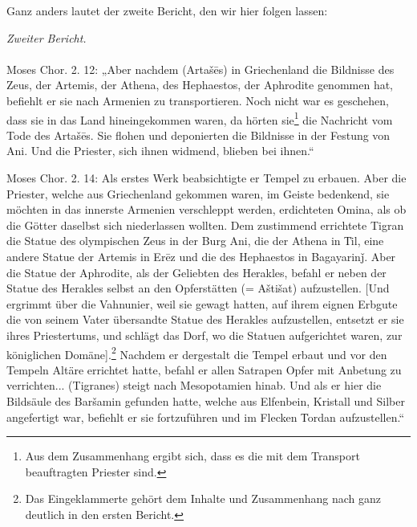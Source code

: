\documentclass{article}
\begin{document}
Ganz anders lautet der zweite Bericht, den wir hier folgen lassen:
\begin{center}
\emph{Zweiter Bericht.}
\end{center}
\paragraph{}
Moses Chor. 2. 12: „Aber nachdem (Artašēs) in Griechenland die Bildnisse des Zeus, der Artemis, der Athena, des Hephaestos, der Aphrodite genommen hat, befiehlt er sie nach Armenien zu transportieren. Noch nicht war es geschehen, dass sie in das Land hineingekommen waren, da hörten sie\footnote{Aus dem Zusammenhang ergibt sich, dass es die mit dem Transport beauftragten Priester sind.} die Nachricht vom Tode des Artašēs. Sie flohen und deponierten die Bildnisse in der Festung von Ani. Und die Priester, sich ihnen widmend, blieben bei ihnen.“

Moses Chor. 2. 14: Als erstes Werk beabsichtigte er Tempel zu erbauen. Aber die Priester, welche aus Griechenland gekommen waren, im Geiste bedenkend, sie möchten in das innerste Armenien verschleppt werden, erdichteten Omina, als ob die Götter daselbst sich niederlassen wollten. Dem zustimmend errichtete Tigran die Statue des olympischen Zeus in der Burg Ani, die der Athena in T͑il, eine andere Statue der Artemis in Erēz und die des Hephaestos in Bagayarinǰ. Aber die Statue der Aphrodite, als der Geliebten des Herakles, befahl er neben der Statue des Herakles selbst an den Opferstätten (= Aštišat) aufzustellen. [Und ergrimmt über die Vahnunier, weil sie gewagt hatten, auf ihrem eignen Erbgute die von seinem Vater übersandte Statue des Herakles aufzustellen, entsetzt er sie ihres Priestertums, und schlägt das Dorf, wo die Statuen aufgerichtet waren, zur königlichen Domäne].\footnote{Das Eingeklammerte gehört dem Inhalte und Zusammenhang nach ganz deutlich in den ersten Bericht.} Nachdem er dergestalt die Tempel erbaut und vor den Tempeln Altäre errichtet hatte, befahl er allen Satrapen Opfer mit Anbetung zu verrichten... (Tigranes) steigt nach Mesopotamien hinab. Und als er hier die Bildsäule des Baršamin gefunden hatte, welche aus Elfenbein, Kristall und Silber angefertigt war, befiehlt er sie fortzuführen und im Flecken T͑ordan aufzustellen.“
\end{document}
